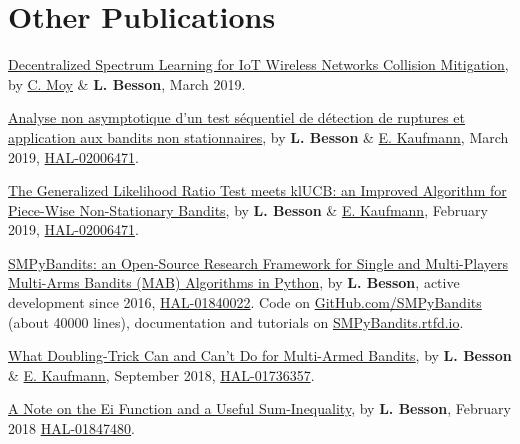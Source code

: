 \section*{Other Publications}
\renewcommand{\labelenumi}{[OP-\arabic{enumi}]}
\begin{etaremune}
\item
  \href{https://hal.inria.fr/hal-XXX/document}{Decentralized Spectrum Learning for IoT Wireless Networks Collision Mitigation}, by \href{https://moychris.wordpress.com/}{C. Moy} \& \textbf{L. Besson}, March 2019.
\item
  \href{https://hal.inria.fr/hal-02006471/document}{Analyse non asymptotique d'un test séquentiel de détection de ruptures et application aux bandits non stationnaires}, by \textbf{L. Besson} \&
  \href{http://chercheurs.lille.inria.fr/ekaufman/research.html}{E.
  Kaufmann}, March 2019,
  \href{https://hal.inria.fr/hal-02006471}{HAL-02006471}.
\item
  \href{https://hal.inria.fr/hal-02006471/document}{The Generalized Likelihood Ratio Test meets klUCB: an Improved Algorithm for Piece-Wise Non-Stationary Bandits}, by \textbf{L. Besson} \&
  \href{http://chercheurs.lille.inria.fr/ekaufman/research.html}{E.
  Kaufmann}, February 2019,
  \href{https://hal.inria.fr/hal-02006471}{HAL-02006471}.
\item
	\href{https://hal.inria.fr/hal-01840022/document}{SMPyBandits: an
	Open-Source Research Framework for Single and Multi-Players Multi-Arms
	Bandits (MAB) Algorithms in Python}, by \textbf{L. Besson},
	active development since 2016,
	\href{https://hal.inria.fr/hal-01840022}{HAL-01840022}. Code on
	\href{https://GitHub.com/SMPyBandits/SMPyBandits}{GitHub.com/SMPyBandits}
	(about 40000 lines), documentation and tutorials on
	\href{https://SMPyBandits.rtfd.io}{SMPyBandits.rtfd.io}.
\item
	\href{https://hal.inria.fr/hal-01736357/document}{What Doubling-Trick
	Can and Can't Do for Multi-Armed Bandits}, by \textbf{L. Besson} \&
	\href{http://chercheurs.lille.inria.fr/ekaufman/research.html}{E.
	Kaufmann}, September 2018,
	\href{https://hal.inria.fr/hal-01736357}{HAL-01736357}.
\item
	\href{https://hal.inria.fr/hal-01847480/document}{A Note on the Ei
	Function and a Useful Sum-Inequality}, by \textbf{L. Besson}, February
	2018 \href{https://hal.inria.fr/hal-01847480}{HAL-01847480}.
\end{etaremune}


